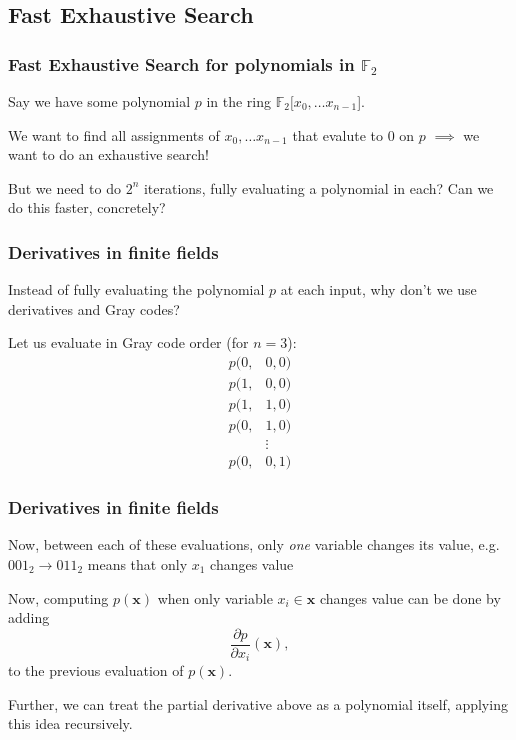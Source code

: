 \documentclass{beamer}
\begin{document}
\subsection{Fast Exhaustive Search}
\begin{frame}
    \frametitle{Fast Exhaustive Search for polynomials in $\mathbb{F}_2$}
    Say we have some polynomial $p$ in the ring $\mathbb{F}_2[x_0,\dots x_{n-1}$].
    
    \pause

    We want to find all assignments of $x_0, \dots x_{n - 1}$ that evalute to 0 on $p$ $\implies$ we want to do an exhaustive search!

    But we need to do $2^n$ iterations, fully evaluating a polynomial in each? Can we do this faster, concretely?
\end{frame}

\begin{frame}
    \frametitle{Derivatives in finite fields}
    Instead of fully evaluating the polynomial $p$ at each input, why don't we use derivatives and Gray codes? 
    
    \pause 

    Let us evaluate in Gray code order (for $n = 3$):
    \begin{equation*}
        \begin{split}
            p(0,&0,0)\\
            p(1,&0,0)\\
            p(1,&1,0)\\
            p(0,&1,0)\\
            &\vdots\\
            p(0,&0,1)
        \end{split}
    \end{equation*}
\end{frame}

\begin{frame}
    \frametitle{Derivatives in finite fields}
    Now, between each of these evaluations, only \textit{one} variable changes its value, e.g. $001_2 \rightarrow 011_2$ means that only $x_1$ changes value

    \pause

    Now, computing $p(\mathbf{x})$ when only variable $x_i \in \mathbf{x}$ changes value can be done by adding 
    $$
        \frac{\partial p}{\partial x_i}(\mathbf{x}),
    $$
    to the previous evaluation of $p(\mathbf{x})$. 

    \pause
    
    Further, we can treat the partial derivative above as a polynomial itself, applying this idea recursively.
\end{frame}
\end{document}
